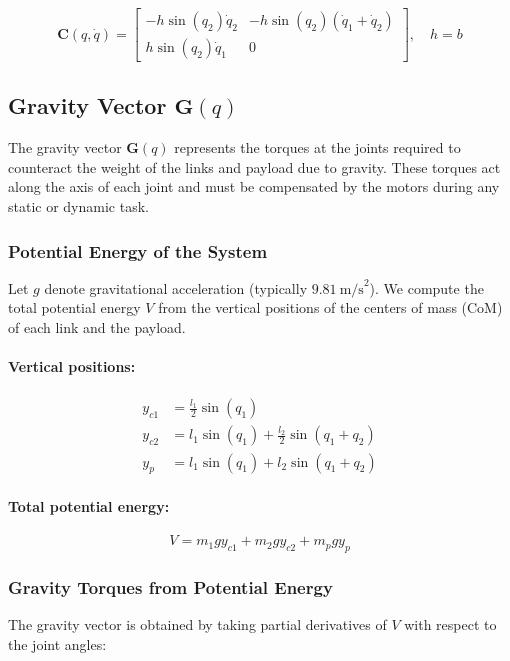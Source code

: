 \documentclass[a4paper,12pt]{article}
\begin{document}
\[
\mathbf{C}(q, \dot{q}) =
\begin{bmatrix}
-h \sin(q_2) \dot{q}_2 & -h \sin(q_2)(\dot{q}_1 + \dot{q}_2) \\
h \sin(q_2) \dot{q}_1 & 0
\end{bmatrix}, \quad h = b
\]
\subsection*{Gravity Vector $\mathbf{G}(q)$}

The gravity vector $\mathbf{G}(q)$ represents the torques at the joints required to counteract the weight of the links and payload due to gravity. These torques act along the axis of each joint and must be compensated by the motors during any static or dynamic task.

\subsubsection*{Potential Energy of the System}

Let $g$ denote gravitational acceleration (typically $9.81~\text{m/s}^2$). We compute the total potential energy $V$ from the vertical positions of the centers of mass (CoM) of each link and the payload.

\paragraph{Vertical positions:}

\begin{align*}
y_{c1} &= \frac{l_1}{2} \sin(q_1) \\
y_{c2} &= l_1 \sin(q_1) + \frac{l_2}{2} \sin(q_1 + q_2) \\
y_p &= l_1 \sin(q_1) + l_2 \sin(q_1 + q_2)
\end{align*}

\paragraph{Total potential energy:}

\[
V = m_1 g y_{c1} + m_2 g y_{c2} + m_p g y_p
\]

\subsubsection*{Gravity Torques from Potential Energy}

The gravity vector is obtained by taking partial derivatives of $V$ with respect to the joint angles:
\end{document}
